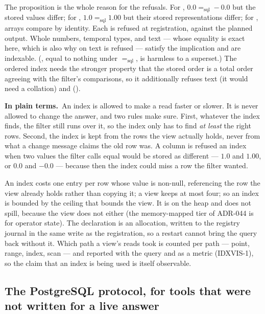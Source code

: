 \documentclass[11pt,a4paper]{article}
\renewcommand{\_}{\oldunderscore\allowbreak}
\newcommand{\code}[1]{\texttt{\pvbreakable{#1}}}
\newcommand{\pt}{\textbf{In plain terms.}\ }
\begin{document}
The proposition is the whole reason for the refusals. For \code{FLOAT}, $0.0 =_{\mathrm{sql}} -0.0$ but
the stored values differ; for \code{DECIMAL}, $1.0 =_{\mathrm{sql}} 1.00$ but their stored
representations differ; for \code{BYTES}, arrays compare by identity. Each is refused at registration,
against the planned output. Whole numbers, temporal types, \code{BOOLEAN} and text --- whose equality is
exact here, which is also why \code{<} on text is refused --- satisfy the implication and are indexable.
(\code{NaN}, equal to nothing under $=_{\mathrm{sql}}$, is harmless to a superset.) The ordered index
needs the stronger property that the stored order is a total order agreeing with the filter's
comparisons, so it additionally refuses text (it would need a collation) and \code{BOOLEAN}
(\code{PRV-2073}).

\begin{plain}
\pt An index is allowed to make a read faster or slower. It is never allowed to change the answer, and
two rules make sure. First, whatever the index finds, the filter still runs over it, so the index only
has to find \emph{at least} the right rows. Second, the index is kept from the rows the view actually
holds, never from what a change message claims the old row was. A column is refused an index when two
values the filter calls equal would be stored as different --- $1.0$ and $1.00$, or $0.0$ and $-0.0$ ---
because then the index could miss a row the filter wanted.
\end{plain}

An index costs one entry per row whose value is non-null, referencing the row the view already holds
rather than copying it; a view keeps at most four; so an index is bounded by the ceiling that bounds the
view. It is on the heap and does not spill, because the view does not either (the memory-mapped tier of
ADR-044 is for operator state). The declaration is an allocation, written to the registry journal in the
same write as the registration, so a restart cannot bring the query back without it. Which path a
view's reads took is counted per path --- point, range, index, scan --- and reported with the query and
as a metric (IDXVIS-1), so the claim that an index is being used is itself observable.

\subsection{The PostgreSQL protocol, for tools that were not written for a live answer}
\end{document}
